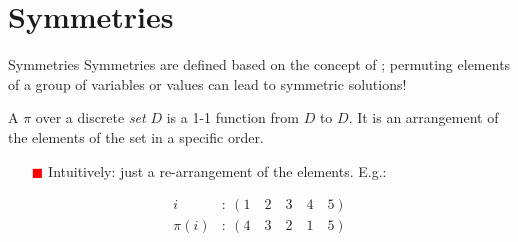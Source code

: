 \documentclass{cons-beamer}
\begin{document}
\section{Symmetries}

\begin{frame}{Symmetries}
  Symmetries are defined    
  based on the concept of ; permuting elements of a group of variables or values can lead to symmetric solutions!
  \vfill

  \begin{definition}
    A  $\pi$ over a discrete \textit{set} $D$ is a 1-1 function from $D$ to $D$. It is an arrangement of the elements of the set in a specific order.
  \end{definition}
  \vfill

  \begin{itemize}
    \item[\textcolor{red}{$\blacksquare$}] Intuitively: just a re-arrangement of the elements. E.g.:
  \end{itemize}

  \[
  \begin{aligned}
      i &: \ (1 \quad 2 \quad 3 \quad 4 \quad 5) \\
      \pi(i) &: \ (4 \quad 3 \quad 2 \quad 1 \quad 5)
  \end{aligned}
  \]
\end{frame}
\end{document}
